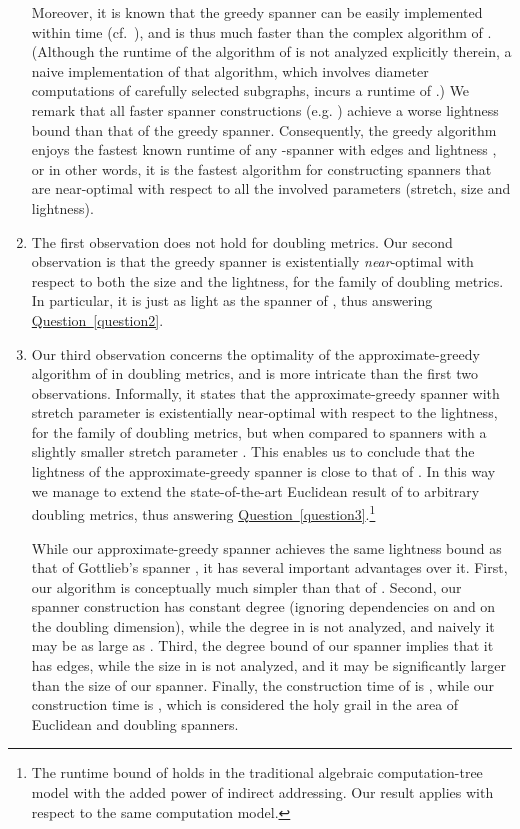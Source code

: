 \documentclass[11pt,letterpaper]{article}
\newcommand{\namedref}[2]{\hyperref[#2]{#1~\ref*{#2}}}
\newcommand{\questionref}[1]{\namedref{Question}{#1}}
\begin{document}
\begin{enumerate}
	\vspace{5pt}
	Moreover, it is known that the greedy spanner 
	can be easily implemented within time  (cf.\ \cite{ES16}),
	and is thus much faster than the complex algorithm of  \cite{CW18}.
	(Although the runtime of the algorithm of \cite{CW18} is not analyzed explicitly therein,
	a naive implementation of that algorithm,
	which involves diameter computations of carefully selected subgraphs, incurs a runtime of .)
	We remark that all faster spanner constructions (e.g. \cite{BS07,ES16,MPVX15,EN17,ADFSW19}) achieve a worse lightness bound than that of the greedy spanner.
	Consequently, the greedy algorithm enjoys the fastest known runtime of any -spanner with  edges and  lightness ,
	or in other words, it is the fastest algorithm for constructing spanners that are near-optimal with respect to all the involved parameters (stretch, size and lightness).
	\vspace{6pt}
	\item The first observation does not hold for doubling metrics.
	Our second observation is that the greedy spanner is existentially \emph{near}-optimal with respect to both the size and the lightness,
	for the family of doubling metrics.
	In particular, it is just as light as the spanner of \cite{Got15}, thus answering \questionref{question2}.
	\vspace{6pt}
	\item Our third observation concerns the optimality of the approximate-greedy algorithm of \cite{DN97,GLN02} in doubling metrics, and is more intricate than the first two observations.
	Informally, it states that the approximate-greedy spanner with stretch parameter  is existentially near-optimal with respect to the lightness,
	for the family of doubling metrics, but when compared to spanners with a slightly smaller stretch parameter .
	This enables us to conclude that the   lightness of the approximate-greedy spanner is close to that of \cite{Got15}.
	In this way we manage to extend the state-of-the-art Euclidean result of \cite{GLN02} to arbitrary doubling metrics, thus answering
	\questionref{question3}.\footnote{The  runtime bound of \cite{GLN02} holds in the traditional algebraic computation-tree model with
		the added power of indirect addressing. Our result applies with respect to the same computation model.}
	
	\vspace{5pt}	
	While our approximate-greedy spanner achieves the same lightness bound as that of Gottlieb's spanner \cite{Got15}, it has several important advantages over it.
First, our algorithm is conceptually much simpler than that of \cite{Got15}.
	Second, our spanner construction has constant degree (ignoring dependencies on  and on the doubling dimension), while the degree in \cite{Got15} is not analyzed, and naively it may be as large as .
	Third, the degree bound of our spanner implies that it has  edges, while the size in \cite{Got15} is not analyzed,
	and it may be significantly larger than the size of our spanner.
Finally, the construction time of \cite{Got15} is , while our construction time is , which is considered the holy grail in the area of Euclidean and doubling spanners.
	

\end{enumerate}
\end{document}
